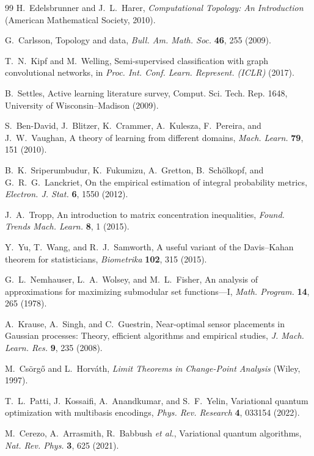 \documentclass[aps,prresearch,reprint,amsmath,amssymb,nofootinbib,superscriptaddress,floatfix]{revtex4-2}
\theoremstyle{definition}
\theoremstyle{remark}
\theoremstyle{plain}
\begin{document}
\begin{thebibliography}{99}
H.~Edelsbrunner and J.~L.~Harer,
\emph{Computational Topology: An Introduction}
(American Mathematical Society, 2010).

G.~Carlsson,
Topology and data,
\emph{Bull. Am. Math. Soc.} \textbf{46}, 255 (2009).

T.~N.~Kipf and M.~Welling,
Semi-supervised classification with graph convolutional networks,
in \emph{Proc. Int. Conf. Learn. Represent. (ICLR)} (2017).

B.~Settles,
Active learning literature survey,
Comput. Sci. Tech. Rep. 1648, University of Wisconsin--Madison (2009).

S.~Ben-David, J.~Blitzer, K.~Crammer, A.~Kulesza, F.~Pereira, and J.~W.~Vaughan,
A theory of learning from different domains,
\emph{Mach. Learn.} \textbf{79}, 151 (2010).

B.~K.~Sriperumbudur, K.~Fukumizu, A.~Gretton, B.~Sch\"olkopf, and G.~R.~G.~Lanckriet,
On the empirical estimation of integral probability metrics,
\emph{Electron. J. Stat.} \textbf{6}, 1550 (2012).

J.~A.~Tropp,
An introduction to matrix concentration inequalities,
\emph{Found. Trends Mach. Learn.} \textbf{8}, 1 (2015).

Y.~Yu, T.~Wang, and R.~J.~Samworth,
A useful variant of the Davis--Kahan theorem for statisticians,
\emph{Biometrika} \textbf{102}, 315 (2015).

G.~L.~Nemhauser, L.~A.~Wolsey, and M.~L.~Fisher,
An analysis of approximations for maximizing submodular set functions---I,
\emph{Math. Program.} \textbf{14}, 265 (1978).

A.~Krause, A.~Singh, and C.~Guestrin,
Near-optimal sensor placements in Gaussian processes: Theory, efficient algorithms and empirical studies,
\emph{J. Mach. Learn. Res.} \textbf{9}, 235 (2008).

M.~Cs\"org\H{o} and L.~Horv\'ath,
\emph{Limit Theorems in Change-Point Analysis}
(Wiley, 1997).

T.~L.~Patti, J.~Kossaifi, A.~Anandkumar, and S.~F.~Yelin,
Variational quantum optimization with multibasis encodings,
\emph{Phys. Rev. Research} \textbf{4}, 033154 (2022).

M.~Cerezo, A.~Arrasmith, R.~Babbush \emph{et al.},
Variational quantum algorithms,
\emph{Nat. Rev. Phys.} \textbf{3}, 625 (2021).


\end{thebibliography}
\end{document}
